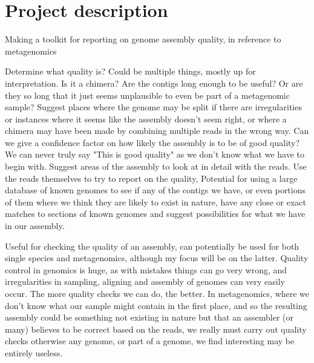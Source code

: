 \documentclass[11pt,fleqn,twoside]{article}
\begin{document}
\wordcount{}

\mmp

\setcounter{tocdepth}{3} %


\section{Project description}
Making a toolkit for reporting on genome assembly quality, in reference to metagenomics

Determine what quality is? Could be multiple things, mostly up for interpretation. Is it a chimera? Are the contigs long enough to be useful? Or are they so long that it just seems unplausible to even be part of a metagenomic sample? Suggest places where the genome may be split if there are irregularities or instances where it seems like the assembly doesn't seem right, or where a chimera may have been made by combining multiple reads in the wrong way. Can we give a confidence factor on how likely the assembly is to be of good quality? We can never truly say "This is good quality" as we don't know what we have to begin with. Suggest areas of the assembly to look at in detail with the reads. Use the reads themselves to try to report on the quality, Potential for using a large database of known genomes to see if any of the contigs we have, or even portions of them where we think they are likely to exist in nature, have any close or exact matches to sections of known genomes and suggest possibilities for what we have in our assembly.

Useful for checking the quality of an assembly, can potentially be used for both single species and metagenomics, although my focus will be on the latter. Quality control in genomics is huge, as with mistakes things can go very wrong, and irregularities in sampling, aligning and assembly of genomes can very easily occur. The more quality checks we can do, the better. In metagenomics, where we don't know what our sample might contain in the first place, and so the resulting assembly could be something not existing in nature but that an assembler (or many) believes to be correct based on the reads, we really must carry out quality checks otherwise any genome, or part of a genome, we find interesting may be entirely useless.
\end{document}
